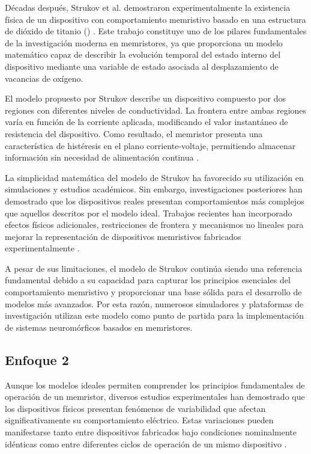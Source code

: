 Décadas después, Strukov et al. demostraron experimentalmente la existencia física de un dispositivo con comportamiento memristivo basado en una estructura de dióxido de titanio () \cite{26}. Este trabajo constituye uno de los pilares fundamentales de la investigación moderna en memristores, ya que proporciona un modelo matemático capaz de describir la evolución temporal del estado interno del dispositivo mediante una variable de estado asociada al desplazamiento de vacancias de oxígeno.

El modelo propuesto por Strukov describe un dispositivo compuesto por dos regiones con diferentes niveles de conductividad. La frontera entre ambas regiones varía en función de la corriente aplicada, modificando el valor instantáneo de resistencia del dispositivo. Como resultado, el memristor presenta una característica de histéresis en el plano corriente-voltaje, permitiendo almacenar información sin necesidad de alimentación continua \cite{26}.

La simplicidad matemática del modelo de Strukov ha favorecido su utilización en simulaciones y estudios académicos. Sin embargo, investigaciones posteriores han demostrado que los dispositivos reales presentan comportamientos más complejos que aquellos descritos por el modelo ideal. Trabajos recientes han incorporado efectos físicos adicionales, restricciones de frontera y mecanismos no lineales para mejorar la representación de dispositivos memristivos fabricados experimentalmente \cite{21,28}.

A pesar de sus limitaciones, el modelo de Strukov continúa siendo una referencia fundamental debido a su capacidad para capturar los principios esenciales del comportamiento memristivo y proporcionar una base sólida para el desarrollo de modelos más avanzados. Por esta razón, numerosos simuladores y plataformas de investigación utilizan este modelo como punto de partida para la implementación de sistemas neuromórficos basados en memristores.

\subsection{Enfoque 2}

Aunque los modelos ideales permiten comprender los principios fundamentales de operación de un memristor, diversos estudios experimentales han demostrado que los dispositivos físicos presentan fenómenos de variabilidad que afectan significativamente su comportamiento eléctrico. Estas variaciones pueden manifestarse tanto entre dispositivos fabricados bajo condiciones nominalmente idénticas como entre diferentes ciclos de operación de un mismo dispositivo \cite{27,29}.

